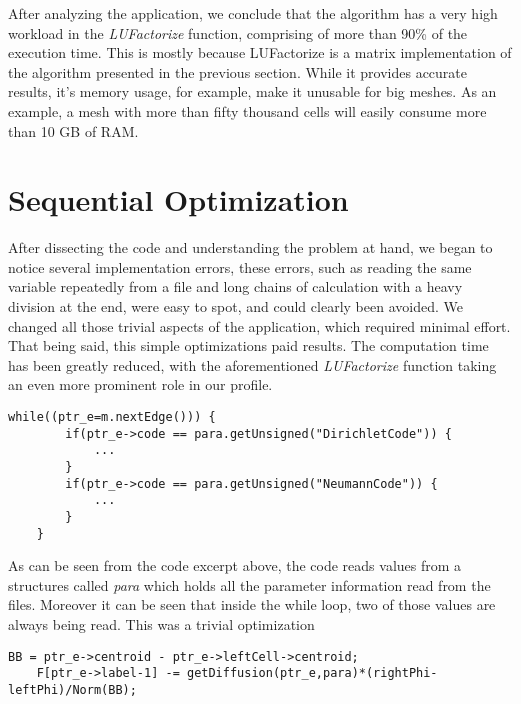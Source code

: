 \documentclass[a4paper,10pt,openright,openbib,twocolumn]{article}
\begin{document}
After analyzing the application, we conclude that the algorithm has a very high workload in the \emph{LUFactorize} function, comprising of more than 90\% of the execution time.
This is mostly because LUFactorize is a matrix implementation of the algorithm presented in the previous section. While it provides accurate results, it's memory usage, for example, make it unusable for big meshes. As an example, a mesh with more than fifty thousand cells will easily consume more than 10 GB of RAM. 


\section{Sequential Optimization}


After dissecting the code and understanding the problem at hand, we began to notice several implementation errors, these errors, such as reading the same variable repeatedly from a file and long chains of calculation with a heavy division at the end, were easy to spot, and could clearly been avoided. We changed all those trivial aspects of the application, which required minimal effort. That being said, this simple optimizations paid results. The computation time has been greatly reduced, with the aforementioned \emph{LUFactorize} function taking an even more prominent role in our profile.

\begin{minipage}{.45\textwidth}
\lstset{
    language=C++,
    basicstyle=\ttfamily\small,
    breaklines=true
}
\begin{lstlisting}[caption=Excerpt from makeFlux]
    while((ptr_e=m.nextEdge())) {
        if(ptr_e->code == para.getUnsigned("DirichletCode")) {
            ...
        }
        if(ptr_e->code == para.getUnsigned("NeumannCode")) {
            ...
        }
    }
\end{lstlisting}
\end{minipage}

As can be seen from the code excerpt above, the code reads values from a structures called \emph{para} which holds all the parameter information read from the files. Moreover it can be seen that inside the while loop, two of those values are always being read. This was a trivial optimization

\begin{minipage}{.45\textwidth}
\lstset{
    language=C++,
    basicstyle=\ttfamily\small,
    breaklines=true
}
\begin{lstlisting}[caption=Another excerpt from makeFlux]    
    BB = ptr_e->centroid - ptr_e->leftCell->centroid;
    F[ptr_e->label-1] -= getDiffusion(ptr_e,para)*(rightPhi-leftPhi)/Norm(BB); 
\end{lstlisting}
\end{minipage}    
\end{document}
